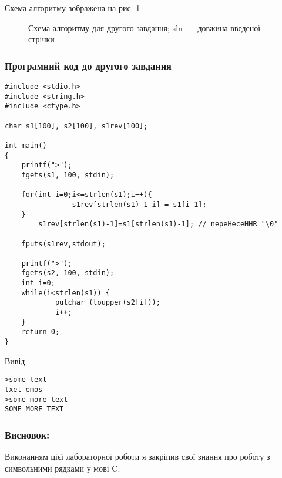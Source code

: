\documentclass[12pt]{extreport}
\begin{document}
\bigskip
Схема алгоритму зображена на рис. \ref{task2}

\begin{figure}[h]
	\centering
	
	\caption{Схема алгоритму для другого завдання;
	sln~--- довжина введеної стрічки}
	\label{task2}
\end{figure}

\subsubsection*{Програмний код до другого завдання}

\begin{lstlisting}[frame=single]
#include <stdio.h>
#include <string.h>
#include <ctype.h>

char s1[100], s2[100], s1rev[100];

int main()
{
	printf(">");
	fgets(s1, 100, stdin);

	for(int i=0;i<=strlen(s1);i++){
            	s1rev[strlen(s1)-1-i] = s1[i-1];
	}
		s1rev[strlen(s1)-1]=s1[strlen(s1)-1]; // nepeHeceHHR "\0"

	fputs(s1rev,stdout);

	printf(">");
	fgets(s2, 100, stdin);
	int i=0;
	while(i<strlen(s1)) {
      		putchar (toupper(s2[i]));
      		i++;
   	}
	return 0;
}
\end{lstlisting}

Вивід:

\begin{lstlisting}
>some text
txet emos
>some more text
SOME MORE TEXT
\end{lstlisting}

\subsubsection*{Висновок:}
Виконанням цієї лабораторної роботи я закріпив свої знання
про роботу з символьними рядками у мові C.
\end{document}
